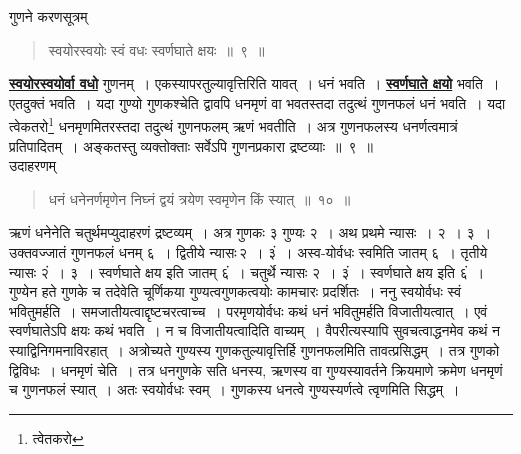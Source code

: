 \documentclass[11pt, openany]{book}
\begin{document}
\vspace{-2mm}
{\bqt गुणने करणसूत्रम्\textendash }

 \label{9}
\begin{quote}
    \ab
    स्वयोरस्वयोः स्वं वधः स्वर्णघाते क्षयः~॥~९~॥
\end{quote}
 
\hyperref[9]{\textbf{स्वयोरस्वयोर्वा वधो}} गुणनम्~। एकस्यापरतुल्यावृत्तिरिति यावत्~। धनं
भवति~। \hyperref[9]{\textbf{स्वर्णघाते क्षयो}} भवति~। एतदुक्तं भवति~। यदा गुण्यो गुणकश्चेति
द्वावपि धनमृणं वा भवतस्तदा तदुत्थं गुणनफलं धनं भवति~। यदा त्वेकतरो\renewcommand{\thefootnote}{1}\footnote{त्वेतकरो}
धनमृणमितरस्तदा तदुत्थं गुणनफलम् ऋणं भवतीति~। अत्र गुणनफलस्य धनर्णत्वमात्रं प्रतिपादितम्~। अङ्कतस्तु व्यक्तोक्ताः सर्वेऽपि गुणनप्रकारा
द्रष्टव्याः~॥~९~॥\\

\vspace{-2mm}
{\bqt उदाहरणम्\textendash }
\begin{quote}
    \eg धनं धनेनर्णमृणेन निघ्नं द्वयं त्रयेण स्वमृणेन किं स्यात्~॥~१०~॥~
\end{quote}
\newpage %

ऋणं धनेनेति चतुर्थमप्युदाहरणं द्रष्टव्यम्~। अत्र गुणकः ३ गुण्यः २~।
अथ प्रथमे न्यासः~। २~। ३~। उक्तवज्जातं गुणनफलं धनम् ६~। द्वितीये
न्यासः\textendash \,२~। ३ं~। अस्व-योर्वधः स्वमिति जातम् ६~।
तृतीये न्यासः २ं~। ३~। स्वर्णघाते क्षय इति जातम् ६ं~। चतुर्थे न्यासः २~। ३ं~। स्वर्णघाते क्षय इति ६ं~। गुण्येन हते गुणके च तदेवेति चूर्णिकया गुण्यत्वगुणकत्वयोः
कामचारः प्रदर्शितः~। ननु स्वयोर्वधः स्वं भवितुमर्हति~।
समजातीयत्वाद्दृष्टचरत्वाच्च~। परमृणयोर्वधः कथं धनं भवितुमर्हति
विजातीयत्वात्~। एवं स्वर्णघातेऽपि क्षयः कथं भवति~। न च
विजातीयत्वादिति वाच्यम्~। वैपरीत्यस्यापि सुवचत्वाद्धनमेव कथं न
स्याद्विनिगमनाविरहात्~। अत्रोच्यते गुण्यस्य गुणकतुल्यावृत्तिर्हि
गुणनफलमिति तावत्प्रसिद्धम्~। तत्र गुणको द्विविधः~। धनमृणं चेति~। तत्र धनगुणके
सति धनस्य, ऋणस्य वा गुण्यस्यावर्तने क्रियमाणे क्रमेण धनमृणं च गुणनफलं
स्यात्~। अतः स्वयोर्वधः स्वम्~। गुणकस्य धनत्वे गुण्यस्यर्णत्वे
त्वृणमिति सिद्धम्~।\\
\end{document}

